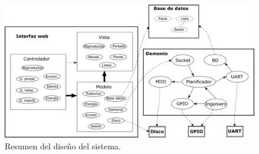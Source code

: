 \smallskip

\begin{figure}[H]
	\noindent \begin{centering}
		\includegraphics[width=\linewidth]{capitulo4/sistema}
		\par\end{centering}
	\smallskip
	\caption{\label{fig:sistema} Resumen del diseño del sistema.}
\end{figure} 

\smallskip

\newpage
\clearpage{\pagestyle{empty}\cleardoublepage}
